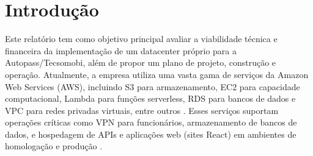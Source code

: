 \documentclass[
	12pt,				%
	oneside,			%
	a4paper,			%
	english,			%
	brazil				%
	]{abntex2unama}
\begin{document}
\frenchspacing


%
% 
%
\imprimircapa

\tableofcontents*
\cleardoublepage



\textual



% 
%
%
\chapter{Introdução}
Este relatório tem como objetivo principal avaliar a viabilidade técnica e financeira da implementação de um datacenter próprio para a Autopass/Tecsomobi, além de propor um plano de projeto, construção e operação. Atualmente, a empresa utiliza uma vasta gama de serviços da Amazon Web Services (AWS), incluindo S3 para armazenamento, EC2 para capacidade computacional, Lambda para funções serverless, RDS para bancos de dados e VPC para redes privadas virtuais, entre outros \cite{cloud_infrastructure}. Esses serviços suportam operações críticas como VPN para funcionários, armazenamento de bancos de dados, e hospedagem de APIs e aplicações web (sites React) em ambientes de homologação e produção \cite{software_defined}.
\end{document}
